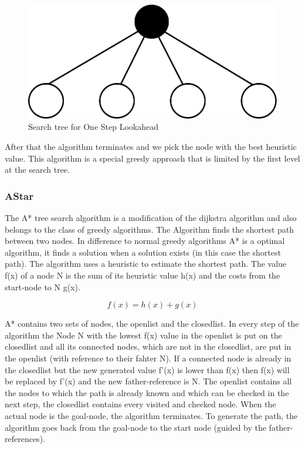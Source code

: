 \begin{figure}
\centering
\includegraphics[scale=0.3]{images/onestep_lookahead.pdf}
\caption{Search tree for One Step Lookahead}
\label{fig:onestep}
\end{figure}


After that the algorithm terminates and we pick the node with the best heuristic value. This algorithm is a special greedy approach that
is limited by the first level at the search tree.

\subsubsection{AStar}

The A* tree search algorithm is a modification of the dijkstra algorithm and also belongs to the class of greedy algorithms. The Algorithm finds the shortest path between two nodes. In difference to normal greedy algorithms A* is a optimal algorithm, it finds a solution when a solution exists (in this case the shortest path). The algorithm uses a heuristic to estimate the shortest path. The value f(x) of a node N is the sum of its heuristic value h(x) and the costs from the start-node to N g(x).

\begin{equation}
f(x)=h(x)+g(x)
\end{equation}


A* contains two sets of nodes, the openlist and the closedlist. In every step of the algorithm the Node N with the lowest f(x) value in the openlist is put on the closedlist and all its connected nodes, which are not in the closedlist, are put in the openlist (with reference to their fahter N). If a connected node is already in the closedlist but the new generated value f'(x) is lower than f(x) then f(x) will be replaced by f'(x) and the new father-reference is N. The openlist contains all the nodes to which the path is already known and which can be checked in the next step, the closedlist contains every visited and checked node. When the actual node is the goal-node, the algorithm terminates. To generate the path, the algorithm goes back from the goal-node to the start node (guided by the father-references). 

